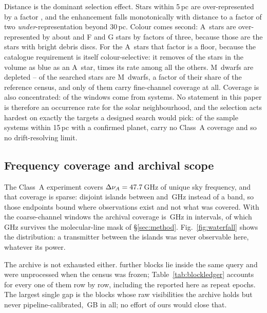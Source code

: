 Distance is the dominant selection effect. Stars within 5\,pc are
over-represented by a factor \SfTopRatio, and the enhancement falls
monotonically with distance to a factor of two \emph{under}-representation
beyond 30\,pc. Colour comes second: A~stars are over-represented by about
\SfARatio{} and F and G stars by factors of three, because those are the
stars with bright debris discs. For the A~stars that factor is a floor,
because the catalogue requirement is itself colour-selective: it removes
\BsNEarly{} of the \BsNEarlyVol{} stars in the volume as blue as an A~star,
\BsEarlyRatio{} times its rate among all the others. M~dwarfs are depleted
--
\SfMSearched{} of the \SfNStar{} searched stars are M~dwarfs, a factor
\SfMRatio{} of their share of the reference census, and only
\SfMClassAStars{} of them carry fine-channel coverage at all. Coverage is also concentrated:
\ConcThreeWin{} of the \NWindows{} windows come from \ConcThreeSys{}
systems. No statement in this paper is therefore an occurrence rate for the
solar neighbourhood, and the selection acts hardest on
exactly the targets a designed search would pick: of the \CsIntNRow{} sample
systems within 15\,pc with a confirmed planet, \CsIntNoClassA{} carry no
Class~A coverage and so no drift-resolving limit.




\subsection{Frequency coverage and archival scope}
\label{sec:coverage}

The Class~A experiment covers $\Delta\nu_A=47.7$\,GHz of unique sky
frequency, and that coverage is sparse: \DomAIslands{} disjoint islands
between \DomAFreqLo{} and \DomAFreqHi\,GHz instead of a band, so those
endpoints bound where observations exist and not what was covered. With the
coarse-channel windows the archival coverage is \DnuAB\,GHz in
\UnionIntervals{} intervals, of which \SearchedUnionGHz\,GHz survives the
molecular-line mask of \S\ref{sec:method}. Fig.~\ref{fig:waterfall} shows the
distribution: a transmitter between the islands was never observable here,
whatever its power.

The archive is not exhausted either. \LdgExtScope{} further blocks lie inside
the same query and were unprocessed when the census was frozen;
Table~\ref{tab:blockledger} accounts for every one of them row by row,
including the \LdgExtEB{} reported here as repeat epochs. The largest single
gap is the \FateNoCal{} blocks whose raw visibilities
the archive holds but never pipeline-calibrated, \FateNoCalGB\,GB in all; no
effort of ours would close that.

